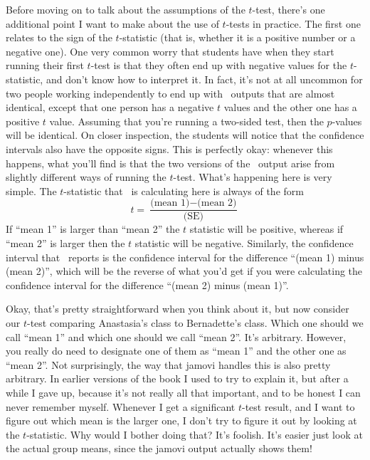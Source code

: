  

Before moving on to talk about the assumptions of the $t$-test, there's one additional point I want to make about the use of $t$-tests in practice. The first one relates to the sign of the $t$-statistic (that is, whether it is a positive number or a negative one).  One very common worry that students have when they start running their first $t$-test is that they often end up with negative values for the $t$-statistic, and don't know how to interpret it. In fact, it's not at all uncommon for two  people working independently to end up with \R\ outputs that are almost identical, except that one person has a negative $t$ values and the other one has a positive $t$ value. Assuming that  you're running a two-sided test, then the $p$-values will be identical. On closer inspection, the students will notice that the confidence intervals also have the opposite signs. This is perfectly okay: whenever this happens, what you'll find is that the two versions of the \R\ output arise from slightly different ways of running the $t$-test. What's happening here is very simple. The $t$-statistic that \R\ is calculating here is always of the form 
$$
t = \frac{\mbox{(mean 1)} -\mbox{(mean 2)}}{ \mbox{(SE)}}
$$
If ``mean 1'' is larger than ``mean 2'' the $t$ statistic will be positive, whereas if ``mean 2'' is larger then the $t$ statistic will be negative. Similarly, the confidence interval that \R\ reports is the confidence interval for the difference ``(mean 1) minus (mean 2)'', which will be the reverse of what you'd get if you were calculating the confidence interval for the difference ``(mean 2) minus (mean 1)''.

Okay, that's pretty straightforward when you think about it, but now consider our $t$-test comparing Anastasia's class to Bernadette's class. Which one should we call ``mean 1'' and which one should we call ``mean 2''. It's arbitrary. However, you really do need to designate one of them as ``mean 1'' and the other one as ``mean 2''. Not surprisingly, the way that jamovi handles this is also pretty arbitrary. In earlier versions of the book I used to try to explain it, but after a while I gave up, because it's not really all that important, and to be honest I can never remember myself. Whenever I get a significant $t$-test result, and I want to figure out which mean is the larger one, I don't try to figure it out by looking at the $t$-statistic. Why would I bother doing that? It's foolish. It's easier just look at the actual group means, since the jamovi output actually shows them!



